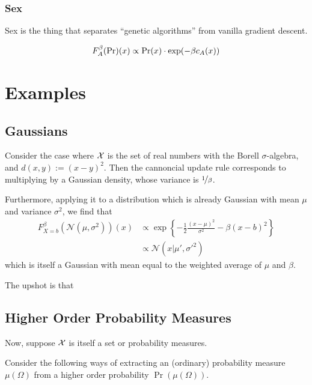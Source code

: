 \documentclass{article}
\begin{document}
\subsubsection{Sex}
Sex is the thing that separates ``genetic algorithms'' from vanilla gradient descent. 

\begin{align*}
    F^\beta_A(\Pr)(x) &\propto \Pr(x) \cdot \exp(-\beta \cost xA) \\
\end{align*}

\section{Examples}
\subsection{Gaussians}
Consider the case where $\X$ is the set of real numbers with the Borell $\sigma$-algebra, and $d(x,y) := (x-y)^2$.
Then the cannoncial update rule corresponds to multiplying by a Gaussian density, whose variance is $\nicefrac1\beta$.

Furthermore, applying it to a distribution which is already Gaussian with mean $\mu$ and variance $\sigma^2$, we find that
\begin{align*}
    F^{\beta}_{X=b}(\mathcal N(\mu, \sigma^2))(x) &\propto
        \exp\left\{ - \frac12 \frac{(x-\mu)^2}{ \sigma^2 } - \beta(x-b)^2\right\}
    \\&\propto \mathcal N(x| \mu', \sigma'^2)
\end{align*}
which is itself a Gaussian with mean equal to the weighted average of $\mu$ and $\beta$.

The upshot is that


\subsection{Higher Order Probability Measures}
Now, suppose $\X$ is itself a set or probability measures.

Consider the following ways of extracting an (ordinary) probability measure $\mu(\Omega)$
from a higher order probability $\Pr(\mu(\Omega))$.
\end{document}
